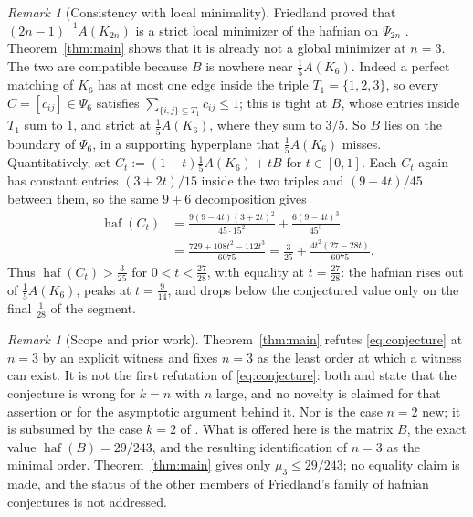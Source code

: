 \documentclass[11pt]{amsart}
\newcommand{\haf}{\operatorname{haf}}
\theoremstyle{remark}
\newtheorem{remark}[theorem]{Remark}
\begin{document}
\begin{remark}[Consistency with local minimality]
Friedland proved that $(2n-1)^{-1}A(K_{2n})$ is a strict local minimizer of the
hafnian on $\Psi_{2n}$ \cite[Lemma~3.1]{Friedland2011}.
Theorem~\ref{thm:main} shows that it is already not a global minimizer at
$n=3$. The two are compatible because $B$ is nowhere near
$\frac15A(K_6)$. Indeed a perfect matching of $K_6$ has at most one edge inside
the triple $T_1=\{1,2,3\}$, so every $C=[c_{ij}]\in\Psi_6$ satisfies
$\sum_{\{i,j\}\subseteq T_1}c_{ij}\le1$; this is tight
at $B$, whose entries inside $T_1$ sum to $1$, and strict at $\frac15A(K_6)$,
where they sum to $3/5$. So $B$ lies on the boundary of $\Psi_6$, in a
supporting hyperplane that $\frac15A(K_6)$ misses. Quantitatively, set
$C_t:=(1-t)\frac15A(K_6)+tB$ for $t\in[0,1]$. Each $C_t$ again has constant
entries $(3+2t)/15$ inside the two triples and $(9-4t)/45$ between them, so the
same $9+6$ decomposition gives
\begin{align*}
  \haf(C_t)
  &=\frac{9(9-4t)(3+2t)^2}{45\cdot15^2}
   +\frac{6(9-4t)^3}{45^3}\\
  &=\frac{729+108t^2-112t^3}{6075}
  =\frac{3}{25}+\frac{4t^2(27-28t)}{6075}.
\end{align*}
Thus $\haf(C_t)>\frac3{25}$ for $0<t<\frac{27}{28}$, with equality at
$t=\frac{27}{28}$: the hafnian rises out of $\frac15A(K_6)$, peaks at
$t=\frac9{14}$, and drops below the conjectured value only on the final
$\frac1{28}$ of the segment.
\end{remark}

\begin{remark}[Scope and prior work]\label{rem:scope}
Theorem~\ref{thm:main} refutes \eqref{eq:conjecture} at $n=3$ by an explicit
witness and fixes $n=3$ as the least order at which a witness can exist. It is
not the first refutation of \eqref{eq:conjecture}: both \cite{Friedland2011} and
\cite{Friedland2012} state that the conjecture is wrong for $k=n$ with $n$
large, and no novelty is claimed for that assertion or for the asymptotic
argument behind it. Nor is the case $n=2$ new; it is subsumed by the case $k=2$
of \cite[Lemma~3.1]{Friedland2011}. What is offered here is the matrix $B$, the
exact value $\haf(B)=29/243$, and the resulting identification of $n=3$ as the
minimal order. Theorem~\ref{thm:main} gives only $\mu_3\le29/243$; no equality
claim is made, and the status of the other members of Friedland's family of
hafnian conjectures is not addressed.
\end{remark}
\end{document}
